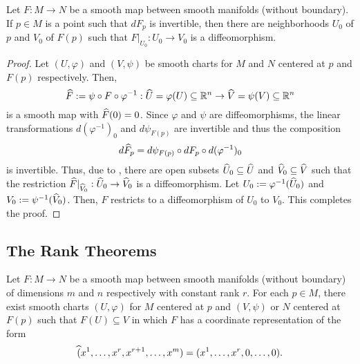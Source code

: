 \begin{theorem}
    Let $F:M\to N$ be a smooth map between smooth manifolds (without boundary). If $p\in M$ is a point such that $dF_p$ is invertible, then there are neighborhoods $U_0$ of $p$ and $V_0$ of $F(p)$ such that $F|_{U_0}: U_0\to V_0$ is a diffeomorphism.
\end{theorem}
\begin{proof}
    Let $(U,\varphi)$ and $(V,\psi)$ be smooth charts for $M$ and $N$ centered at $p$ and $F(p)$ respectively. Then, 
    \begin{equation*}
        \widehat{F} := \psi\circ F\circ\varphi^{-1}: \widehat{U} = \varphi(U)\subseteq\mathbb{R}^n\to\widehat{V} = \psi(V)\subseteq\mathbb{R}^n
    \end{equation*}
    is a smooth map with $\widehat{F}(0) = 0$. Since $\varphi$ and $\psi$ are diffeomorphisms, the linear transformations $d(\varphi^{-1})_0$ and $d\psi_{F(p)}$ are invertible and thus the composition 
    \begin{equation*}
        d\widehat{F}_p = d\psi_{F(p)}\circ dF_p\circ d(\varphi^{-1})_0
    \end{equation*}
    is invertible. Thus, due to , there are open subsets $\widehat{U}_0\subseteq\widehat{U}$ and $\widehat{V}_0\subseteq\widehat{V}$ such that the restriction $\widehat{F}|_{\widehat{V}_0}: \widehat{U}_0\to\widehat{V}_0$ is a diffeomorphism. Let $U_0 := \varphi^{-1}(\widehat{U}_0)$ and $V_0 := \psi^{-1}(\widehat{V}_0)$. Then, $F$ restricts to a diffeomorphism of $U_0$ to $V_0$. This completes the proof.
\end{proof}

\subsection{The Rank Theorems}

\begin{theorem}
    Let $F: M\to N$ be a smooth map between smooth manifolds (without boundary) of dimensions $m$ and $n$ respectively with constant rank $r$. For each $p\in M$, there exist smooth charts $(U,\varphi)$ for $M$ centered at $p$ and $(V,\psi)$ or $N$ centered at $F(p)$ such that $F(U)\subseteq V$ in which $F$ has a coordinate representation of the form 
    \begin{equation*}
        \widehat{(}x^1,\dots,x^r,x^{r + 1},\dots,x^m) = (x^1,\dots,x^r,0,\dots,0).
    \end{equation*}
\end{theorem}